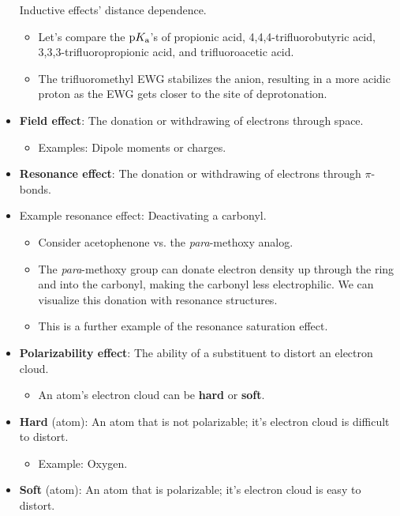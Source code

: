 \documentclass[../notes.tex]{subfiles}
\begin{document}
\begin{itemize}
\begin{table}[h!]
        \caption{Inductive effects' distance dependence.}
        \label{tab:inductiveDistance}
    \end{table}
    \begin{itemize}
        \item Let's compare the $\textup{p}K_\textup{a}$'s of propionic acid, 4,4,4-trifluorobutyric acid, 3,3,3-trifluoropropionic acid, and trifluoroacetic acid.
        \item The trifluoromethyl EWG stabilizes the anion, resulting in a more acidic proton as the EWG gets closer to the site of deprotonation.
    \end{itemize}
    \item \textbf{Field effect}: The donation or withdrawing of electrons through space.
    \begin{itemize}
        \item Examples: Dipole moments or charges.
    \end{itemize}
    \item \textbf{Resonance effect}: The donation or withdrawing of electrons through $\pi$-bonds.
    \item Example resonance effect: Deactivating a carbonyl.
    \begin{itemize}
        \item Consider acetophenone vs. the \emph{para}-methoxy analog.
        \item The \emph{para}-methoxy group can donate electron density up through the ring and into the carbonyl, making the carbonyl less electrophilic. We can visualize this donation with resonance structures.
        \item This is a further example of the resonance saturation effect.
    \end{itemize}
    \item \textbf{Polarizability effect}: The ability of a substituent to distort an electron cloud.
    \begin{itemize}
        \item An atom's electron cloud can be \textbf{hard} or \textbf{soft}.
    \end{itemize}
    \item \textbf{Hard} (atom): An atom that is not polarizable; it's electron cloud is difficult to distort.
    \begin{itemize}
        \item Example: Oxygen.
    \end{itemize}
    \item \textbf{Soft} (atom): An atom that is polarizable; it's electron cloud is easy to distort.

\end{itemize}
\end{document}
